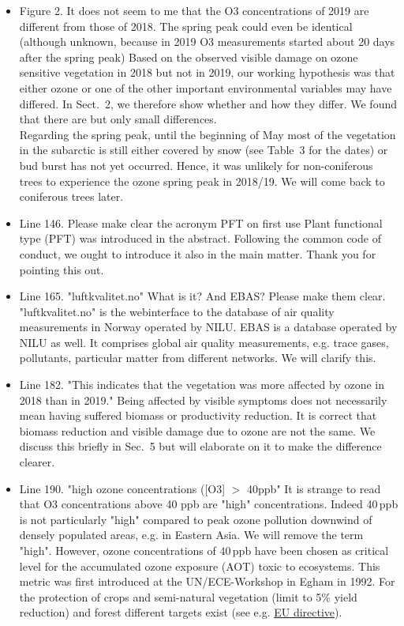 \documentclass{scrartcl}
\begin{document}
\begin{itemize}
\item {\color{blue}Figure 2. It does not seem to me that the O3 concentrations of 2019 are different from those of 2018. The spring peak could even be identical (although unknown, because in 2019 O3 measurements started about 20 days after the spring peak)}
Based on the observed visible damage on ozone sensitive vegetation in 2018 but not in 2019, our working hypothesis was that either ozone or one of the other important environmental variables may have differed. In Sect.~2, we therefore show whether and how they differ. We found that there are but only small differences.\\
Regarding the spring peak, until the beginning of May most of the vegetation in the subarctic is still either covered by snow (see Table~3 for the dates) or bud burst has not yet occurred. Hence, it was unlikely for non-coniferous trees to experience the ozone spring peak in 2018/19. We will come back to coniferous trees later. 

\item {\color{blue}Line 146. Please make clear the acronym PFT on first use}
Plant functional type (PFT) was introduced in the abstract. Following the common code of conduct, we ought to introduce it also in the main matter. Thank you for pointing this out.

\item {\color{blue}Line 165. "luftkvalitet.no" What is it? And EBAS? Please make them clear.}
"luftkvalitet.no" is the webinterface to the database of air quality measurements in Norway operated by NILU. EBAS is a database operated by NILU as well. It comprises global air quality measurements, e.g. trace gases, pollutants, particular matter from different networks. We will clarify this.

\item {\color{blue}Line 182. "This indicates that the vegetation was more affected by ozone in 2018 than in 2019." Being affected by visible symptoms does not necessarily mean having suffered biomass or productivity reduction.} It is correct that biomass reduction and visible damage due to ozone are not the same. We discuss this briefly in Sec.~5 but will elaborate on it to make the difference clearer. 

\item {\color{blue}Line 190. "high ozone concentrations ([O3] $>$ 40ppb" It is strange to read that O3 concentrations above 40 ppb are "high" concentrations.}
Indeed 40\,ppb is not particularly "high" compared to peak ozone pollution downwind of densely populated areas, e.g. in Eastern Asia. We will remove the term "high". However, ozone concentrations of $40\,\mathrm{ppb}$ have been chosen as critical level for the accumulated ozone exposure (AOT) toxic to ecosystems. This metric was first introduced at the UN/ECE-Workshop in Egham in 1992. For the protection of crops and semi-natural vegetation (limit to 5\% yield reduction) and forest different targets exist (see e.g. \href{https://www.eea.europa.eu/publications/TOP08-98/page008.html}{EU directive}).


\end{itemize}
\end{document}
